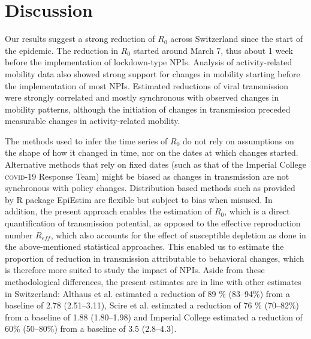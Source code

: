 \section{Discussion}
Our results suggest a strong reduction of $R_0$ across Switzerland since the start of the epidemic. The reduction in $R_0$ started around March 7, thus about 1 week before the implementation of lockdown-type NPIs. Analysis of activity-related mobility data also showed strong support for changes in mobility starting before the implementation of most NPIs. Estimated reductions of viral transmission were strongly correlated and mostly synchronous with observed changes in mobility patterns, although the initiation of changes in transmission preceded measurable changes in activity-related mobility. 

The methods used to infer the time series of $R_0$ do not rely on assumptions on the shape of how it changed in time, nor on the dates at which changes started. Alternative methods that rely on fixed dates (such as that of the Imperial College \textsc{covid}-19 Response Team\cite[-6\baselineskip]{Flaxman:Report13Estimating:2020}) might be biased as changes in transmission are not synchronous with policy changes. Distribution based methods such as provided by R package EpiEstim\cite[-4\baselineskip]{Wallinga:DifferentEpidemicCurves:2004,Cori:NewFrameworkSoftware:2013} are flexible but subject to bias when misused\cite{Lipsitch:CommentPanLiu:2020}. In addition, the present approach enables the estimation of $R_0$, which is a direct quantification of transmission potential, as opposed to the effective reproduction number $R_{eff}$, which also accounts for the effect of susceptible depletion as done in the above-mentioned statistical approaches. This enabled us to estimate the proportion of reduction in transmission attributable to behavioral changes, which is therefore more suited to study the impact of NPIs. Aside from these methodological differences, the present estimates are in line with other estimates in Switzerland: Althaus et al.\cite{Althaus:RealtimeModelingProjections:2020} estimated a reduction of 89 \% (83–94\%) from a baseline of 2.78 (2.51–3.11), Scire et al.\cite{Scire:ReproductiveNumberCOVID19:2020} estimated a reduction of 76 \% (70–82\%) from a baseline of 1.88 (1.80–1.98) and Imperial College estimated a reduction of 60\% (50–80\%) from a baseline of 3.5 (2.8–4.3)\cite{Flaxman:Report13Estimating:2020}. 

